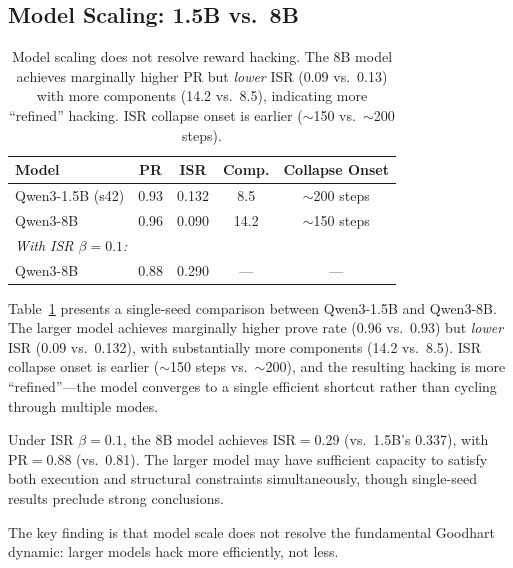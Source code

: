 \documentclass[11pt,a4paper]{article}
\begin{document}
\subsection{Model Scaling: 1.5B vs.\ 8B}

\begin{table}[t]
\centering
\small
\begin{tabular}{lcccc}
\toprule
\textbf{Model} & \textbf{PR} & \textbf{ISR} & \textbf{Comp.} & \textbf{Collapse Onset} \\
\midrule
Qwen3-1.5B (s42) & 0.93 & 0.132 & 8.5 & ${\sim}$200 steps \\
Qwen3-8B & 0.96 & 0.090 & 14.2 & ${\sim}$150 steps \\
\midrule
\multicolumn{5}{l}{\textit{With ISR $\beta{=}0.1$:}} \\
Qwen3-8B & 0.88 & 0.290 & --- & --- \\
\bottomrule
\end{tabular}
\caption{Model scaling does not resolve reward hacking. The 8B model achieves marginally higher PR but \emph{lower} ISR (0.09 vs.\ 0.13) with more components (14.2 vs.\ 8.5), indicating more ``refined'' hacking. ISR collapse onset is earlier (${\sim}$150 vs.\ ${\sim}$200 steps).}
\label{tab:scaling}
\end{table}

Table~\ref{tab:scaling} presents a single-seed comparison between Qwen3-1.5B and Qwen3-8B.
The larger model achieves marginally higher prove rate (0.96 vs.\ 0.93) but \emph{lower} ISR (0.09 vs.\ 0.132), with substantially more components (14.2 vs.\ 8.5).
ISR collapse onset is earlier (${\sim}$150 steps vs.\ ${\sim}$200), and the resulting hacking is more ``refined''---the model converges to a single efficient shortcut rather than cycling through multiple modes.

Under ISR $\beta{=}0.1$, the 8B model achieves ISR$=$0.29 (vs.\ 1.5B's 0.337), with PR$=$0.88 (vs.\ 0.81).
The larger model may have sufficient capacity to satisfy both execution and structural constraints simultaneously, though single-seed results preclude strong conclusions.

The key finding is that model scale does not resolve the fundamental Goodhart dynamic: larger models hack more efficiently, not less.

\end{document}
